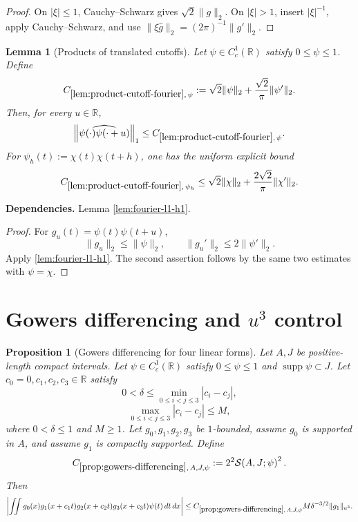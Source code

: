 \documentclass[11pt]{article}
\newtheorem{proposition}[proposition]{Proposition}
\newtheorem{lemma}[lemma]{Lemma}
\theoremstyle{definition}
\theoremstyle{remark}
\newcommand{\R}{\mathbb R}
\newcommand{\supp}{\operatorname{supp}}
\newcommand{\1}{\mathbf 1}
\newcommand{\FT}[1]{\widehat{#1}}
\newcommand{\dd}{\,d}
\newcommand{\uNorm}[2]{\lVert #1\rVert_{u^{#2}}}
\newcommand{\lpNorm}[2]{\lVert #1\rVert_{#2}}
\newcommand{\uses}[1]{\par\smallskip\noindent\textbf{Dependencies.} #1\par\smallskip}
\newcommand{\Ssize}[2]{\mathcal S\!\left(#1;#2\right)}
\begin{document}
\begin{proof}
On $|\xi|\leq1$, Cauchy--Schwarz gives $\sqrt2\lpNorm g2$.  On $|\xi|>1$, insert $|\xi|^{-1}$, apply Cauchy--Schwarz, and use
$\lpNorm{\xi\FT g}2=(2\pi)^{-1}\lpNorm{g'}2$.
\end{proof}

\begin{lemma}[Products of translated cutoffs]\label{lem:product-cutoff-fourier}
Let $\psi\in C_c^1(\R)$ satisfy $0\leq\psi\leq1$.  Define
\[
C_{\ref{lem:product-cutoff-fourier},\,\psi}
:=
\sqrt2\lpNorm\psi2+\frac{\sqrt2}{\pi}\lpNorm{\psi'}2.
\]
Then, for every $u\in\R$,
\[
\left\lVert\FT{\psi(\cdot)\psi(\cdot+u)}\right\rVert_1
\leq
C_{\ref{lem:product-cutoff-fourier},\,\psi}.
\]
For $\psi_h(t):=\chi(t)\chi(t+h)$, one has the uniform explicit bound
\[
C_{\ref{lem:product-cutoff-fourier},\,\psi_h}
\leq
\sqrt2\lpNorm\chi2+\frac{2\sqrt2}{\pi}\lpNorm{\chi'}2.
\]
\end{lemma}

\uses{Lemma \ref{lem:fourier-l1-h1}.}

\begin{proof}
For $g_u(t)=\psi(t)\psi(t+u)$,
\[
\lpNorm{g_u}2\leq\lpNorm\psi2,
\qquad
\lpNorm{g_u'}2\leq2\lpNorm{\psi'}2.
\]
Apply \cref{lem:fourier-l1-h1}.  The second assertion follows by the same two estimates with $\psi=\chi$.
\end{proof}

\section{Gowers differencing and \texorpdfstring{$u^3$}{u3} control}

\begin{proposition}[Gowers differencing for four linear forms]\label{prop:gowers-differencing}
Let $A,J$ be positive-length compact intervals.  Let $\psi\in C_c^1(\R)$ satisfy
$0\leq\psi\leq1$ and $\supp\psi\subset J$.  Let
$c_0=0,c_1,c_2,c_3\in\R$ satisfy
\[
0<\delta\leq\min_{0\leq i<j\leq3}|c_i-c_j|,
\]
\[
\max_{0\leq i<j\leq3}|c_i-c_j|\leq M,
\]
where $0<\delta\leq1$ and $M\geq1$.  Let $g_0,g_1,g_2,g_3$ be $1$-bounded, assume $g_0$ is supported in $A$, and assume $g_1$ is compactly supported.  Define
\[
C_{\ref{prop:gowers-differencing},\,A,J,\psi}
:=
2^2\Ssize{A,J}{\psi}^{2}.
\]
Then
\[
\left|
\iint g_0(x)g_1(x+c_1t)g_2(x+c_2t)g_3(x+c_3t)\psi(t)
\dd t\dd x
\right|
\leq
C_{\ref{prop:gowers-differencing},\,A,J,\psi}
M\delta^{-3/2}\uNorm{g_1}3.
\]
\end{proposition}
\end{document}
